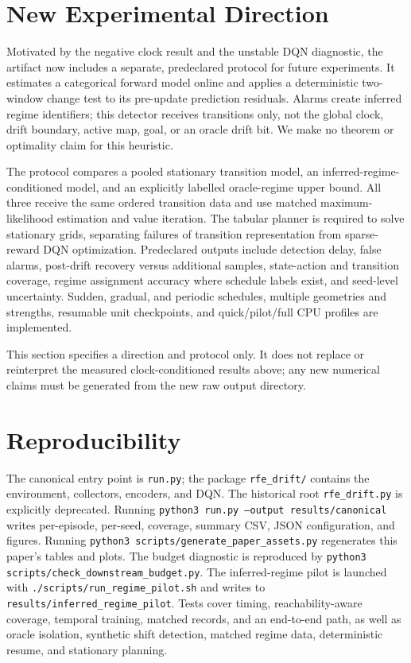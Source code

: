 \documentclass[10pt]{article}
\begin{document}
\section{New Experimental Direction}
Motivated by the negative clock result and the unstable DQN diagnostic, the
artifact now includes a separate, predeclared protocol for future experiments.
It estimates a categorical forward model online and applies a deterministic
two-window change test to its pre-update prediction residuals.  Alarms create
inferred regime identifiers; this detector receives transitions only, not the
global clock, drift boundary, active map, goal, or an oracle drift bit.  We
make no theorem or optimality claim for this heuristic.

The protocol compares a pooled stationary transition model, an
inferred-regime-conditioned model, and an explicitly labelled
oracle-regime upper bound.  All three receive the same ordered transition data
and use matched maximum-likelihood estimation and value iteration.  The
tabular planner is required to solve stationary grids, separating failures of
transition representation from sparse-reward DQN optimization.  Predeclared
outputs include detection delay, false alarms, post-drift recovery versus
additional samples, state-action and transition coverage, regime assignment
accuracy where schedule labels exist, and seed-level uncertainty.  Sudden,
gradual, and periodic schedules, multiple geometries and strengths, resumable
unit checkpoints, and quick/pilot/full CPU profiles are implemented.

This section specifies a direction and protocol only.  It does not replace or
reinterpret the measured clock-conditioned results above; any new numerical
claims must be generated from the new raw output directory.

\section{Reproducibility}
The canonical entry point is \texttt{run.py}; the package
\texttt{rfe\_drift/} contains the environment, collectors, encoders, and DQN.
The historical root \texttt{rfe\_drift.py} is explicitly deprecated.  Running
\texttt{python3 run.py --output results/canonical} writes per-episode,
per-seed, coverage, summary CSV, JSON configuration, and figures.  Running
\texttt{python3 scripts/generate\_paper\_assets.py} regenerates this paper's
tables and plots.  The budget diagnostic is reproduced by
\texttt{python3 scripts/check\_downstream\_budget.py}.  The inferred-regime
pilot is launched with \texttt{./scripts/run\_regime\_pilot.sh} and writes to
\texttt{results/inferred\_regime\_pilot}. Tests cover timing,
reachability-aware coverage, temporal training, matched records, and an
end-to-end path, as well as oracle isolation, synthetic shift detection,
matched regime data, deterministic resume, and stationary planning.
\end{document}
